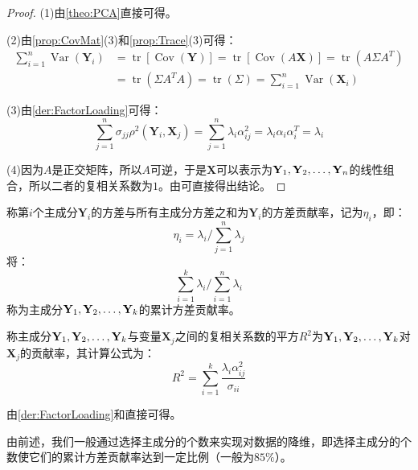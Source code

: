 \begin{proof}
	(1)由\cref{theo:PCA}直接可得。\par
	(2)由\cref{prop:CovMat}(3)和\cref{prop:Trace}(3)可得：
	\begin{align*}
		\sum_{i=1}^{n}\operatorname{Var}(\mathbf{Y}_i)
		&=\operatorname{tr}[\operatorname{Cov}(\mathbf{Y})]=\operatorname{tr}[\operatorname{Cov}(A\mathbf{X})]=\operatorname{tr}(A\Sigma A^T) \\
		&=\operatorname{tr}(\Sigma A^TA)=\operatorname{tr}(\Sigma)=\sum_{i=1}^{n}\operatorname{Var}(\mathbf{X}_i)
	\end{align*}\par
	(3)由\cref{der:FactorLoading}可得：
	\begin{equation*}
		\sum_{j=1}^{n}\sigma_{jj}\rho^2(\mathbf{Y}_i,\mathbf{X}_j)=\sum_{j=1}^{n}\lambda_i\alpha_{ij}^2=\lambda_i\alpha_i\alpha_i^T=\lambda_i
	\end{equation*}\par
	(4)因为$A$是正交矩阵，所以$A$可逆，于是$\mathbf{X}$可以表示为$\mathbf{Y}_1, \mathbf{Y}_2, \dots, \mathbf{Y}_{n}$的线性组合，所以二者的复相关系数为$1$。由可直接得出结论。
\end{proof}
\begin{definition}
	称第$i$个主成分$\mathbf{Y}_i$的方差与所有主成分方差之和为$\mathbf{Y}_i$的方差贡献率，记为$\eta_i$，即：
	\begin{equation*}
		\eta_i=\lambda_i\Big/\sum\limits_{j=1}^{n}\lambda_j
	\end{equation*}
	将：
	\begin{equation*}
		\sum\limits_{i=1}^{k}\lambda_i\Big/\sum\limits_{i=1}^{n}\lambda_i
	\end{equation*}
	称为主成分$\mathbf{Y}_1, \mathbf{Y}_2, \dots, \mathbf{Y}_{k}$的累计方差贡献率。
\end{definition}
\begin{definition}
	称主成分$\mathbf{Y}_1, \mathbf{Y}_2, \dots, \mathbf{Y}_{k}$与变量$\mathbf{X}_j$之间的复相关系数的平方$R^2$为$\mathbf{Y}_1, \mathbf{Y}_2, \dots, \mathbf{Y}_{k}$对$\mathbf{X}_j$的贡献率，其计算公式为：
	\begin{equation*}
		R^2=\sum_{i=1}^{k}\frac{\lambda_i\alpha_{ij}^2}{\sigma_{ii}}
	\end{equation*}
\end{definition}
\begin{derivation}
	由\cref{der:FactorLoading}和直接可得。
\end{derivation}
由前述，我们一般通过选择主成分的个数来实现对数据的降维，即选择主成分的个数使它们的累计方差贡献率达到一定比例（一般为$85\%$）。

